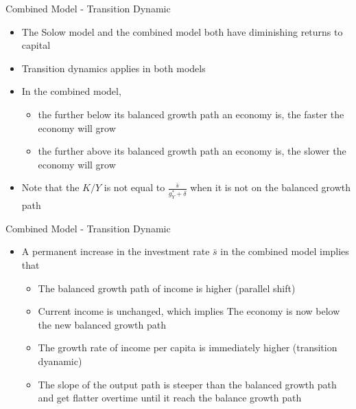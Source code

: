 \documentclass[aspectratio=1610]{beamer}
\begin{document}
\begin{frame}[wide]{Combined Model - Transition Dynamic}
	\begin{itemize}
		\item The Solow model and the combined model both have diminishing returns to capital
		\vspace{1mm}
		\item Transition dynamics applies in both models
		\vspace{1mm}
		\item In the combined model,
		\vspace{1mm}
		\begin{itemize}
			\item the further below its balanced growth path an economy is, the faster the economy will grow
			\item the further above its balanced growth path an economy is, the slower the economy will grow
		\end{itemize}
		\vspace{1mm}
		\item Note that the $K/Y$ is not equal to $\frac{\bar{s}}{g_Y^* + \delta}$ when it is not on the balanced growth path
	\end{itemize}
\end{frame}

\begin{frame}[wide]{Combined Model - Transition Dynamic}
	\begin{itemize}
		\item A permanent increase in the investment rate $\bar{s}$ in the combined model implies that
		\vspace{2mm}
		\begin{itemize}
			\item The balanced growth path of income is higher (parallel shift)
			\item Current income is unchanged, which implies The economy is now below the new balanced growth path
			\item The growth rate of income per capita is immediately higher (transition dyanamic)
			\item The slope of the output path is steeper than the balanced growth path and get flatter overtime until it reach the balance growth path
		\end{itemize}
		
	\end{itemize}
\end{frame}
\end{document}
